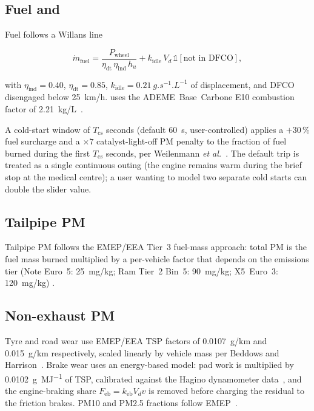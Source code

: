 \documentclass[11pt,a4paper]{article}
\begin{document}
\subsection{Fuel and \texorpdfstring{}{CO2}}

Fuel follows a Willans line~\cite{guzzella2013}

\begin{equation}
\dot m_{\text{fuel}} =
\frac{P_{\text{wheel}}}{\eta_{\text{dt}} \, \eta_{\text{ind}} \, h_u}
+ k_{\text{idle}} \, V_d \, \mathbb{1}[\text{not in DFCO}],
\end{equation}

with $\eta_{\text{ind}} = 0.40$, $\eta_{\text{dt}} = 0.85$, $k_{\text{idle}}
= \SI{0.21}{g.s^{-1}.L^{-1}}$ of displacement, and DFCO disengaged
below \SI{25}{km/h}.  uses the ADEME~Base~Carbone E10
combustion factor of \SI{2.21}{kg/L}~\cite{ademe2023}.

A cold-start window of $T_{\text{cs}}$ seconds (default \SI{60}{s},
user-controlled) applies a $+30\,\%$ fuel surcharge and a
$\times 7$ catalyst-light-off PM penalty to the fraction of fuel
burned during the first $T_{\text{cs}}$ seconds, per Weilenmann
\textit{et al.}~\cite{weilenmann2009}. The default trip is treated
as a single continuous outing (the engine remains warm during the
brief stop at the medical centre); a user wanting to model two
separate cold starts can double the slider value.

\subsection{Tailpipe PM}

Tailpipe PM follows the EMEP/EEA Tier~3 fuel-mass approach: total PM
is the fuel mass burned multiplied by a per-vehicle factor that
depends on the emissions tier (Note Euro~5: \SI{25}{mg/kg}; Ram
Tier~2 Bin~5: \SI{90}{mg/kg}; X5~Euro~3: \SI{120}{mg/kg})
\cite{emep2023si}.

\subsection{Non-exhaust PM}

Tyre and road wear use EMEP/EEA TSP factors of \SI{0.0107}{g/km} and
\SI{0.015}{g/km} respectively, scaled linearly by vehicle mass per
Beddows and Harrison~\cite{beddows2021}. Brake wear uses an
energy-based model: pad work is multiplied by \SI{0.0102}{g.MJ^{-1}}
of TSP, calibrated against the Hagino dynamometer
data~\cite{hagino2016}, and the engine-braking share
$F_{\text{eb}} = k_{\text{eb}} V_d v$ is removed before charging the
residual to the friction brakes. PM10 and PM2.5 fractions follow
EMEP~\cite{emep2023nonexhaust}.
\end{document}
